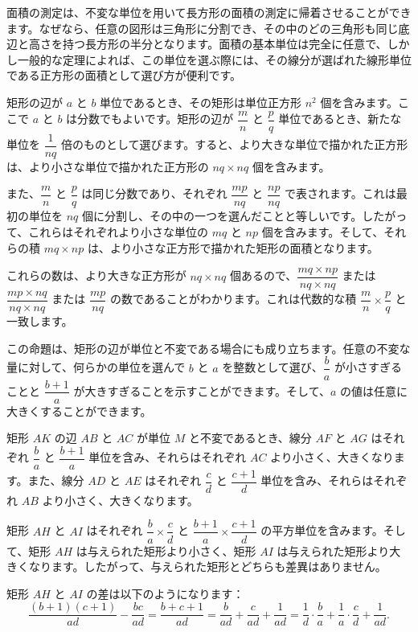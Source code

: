 \documentclass[a4paper,11pt,openany]{ltjsbook}
\begin{document}
面積の測定は、不変な単位を用いて長方形の面積の測定に帰着させることができます。なぜなら、任意の図形は三角形に分割でき、その中のどの三角形も同じ底辺と高さを持つ長方形の半分となります。面積の基本単位は完全に任意で、しかし一般的な定理によれば、この単位を選ぶ際には、その線分が選ばれた線形単位である正方形の面積として選び方が便利です。

矩形の辺が $a$ と $b$ 単位であるとき、その矩形は単位正方形 $n^2$ 個を含みます。ここで $a$ と $b$ は分数でもよいです。矩形の辺が $\dfrac{m}{n}$ と $\dfrac{p}{q}$ 単位であるとき、新たな単位を $\dfrac{1}{nq}$ 倍のものとして選びます。すると、より大きな単位で描かれた正方形は、より小さな単位で描かれた正方形の $nq \times nq$ 個を含みます。

また、$\dfrac{m}{n}$ と $\dfrac{p}{q}$ は同じ分数であり、それぞれ $\dfrac{mp}{nq}$ と $\dfrac{np}{nq}$ で表されます。これは最初の単位を $nq$ 個に分割し、その中の一つを選んだことと等しいです。したがって、これらはそれぞれより小さな単位の $mq$ と $np$ 個を含みます。そして、それらの積 $mq \times np$ は、より小さな正方形で描かれた矩形の面積となります。

これらの数は、より大きな正方形が $nq \times nq$ 個あるので、$\dfrac{mq \times np}{nq \times nq}$ または $\dfrac{mp \times nq}{nq \times nq}$ または $\dfrac{mp}{nq}$ の数であることがわかります。これは代数的な積 $\dfrac{m}{n} \times \dfrac{p}{q}$ と一致します。

この命題は、矩形の辺が単位と不変である場合にも成り立ちます。任意の不変な量に対して、何らかの単位を選んで $b$ と $a$ を整数として選び、$\dfrac{b}{a}$ が小さすぎることと $\dfrac{b+1}{a}$ が大きすぎることを示すことができます。そして、$a$ の値は任意に大きくすることができます。

矩形 $AK$ の辺 $AB$ と $AC$ が単位 $M$ と不変であるとき、線分 $AF$ と $AG$ はそれぞれ $\dfrac{b}{a}$ と $\dfrac{b+1}{a}$ 単位を含み、それらはそれぞれ $AC$ より小さく、大きくなります。また、線分 $AD$ と $AE$ はそれぞれ $\dfrac{c}{d}$ と $\dfrac{c+1}{d}$ 単位を含み、それらはそれぞれ $AB$ より小さく、大きくなります。

矩形 $AH$ と $AI$ はそれぞれ $\dfrac{b}{a} \times \dfrac{c}{d}$ と $\dfrac{b+1}{a} \times \dfrac{c+1}{d}$ の平方単位を含みます。そして、矩形 $AH$ は与えられた矩形より小さく、矩形 $AI$ は与えられた矩形より大きくなります。したがって、与えられた矩形とどちらも差異はありません。

矩形 $AH$ と $AI$ の差は以下のようになります：
\[
\dfrac{(b+1)(c+1)}{ad} - \dfrac{bc}{ad} = \dfrac{b+c+1}{ad}
= \dfrac{b}{ad} + \dfrac{c}{ad} + \dfrac{1}{ad}
= \dfrac{1}{d} \cdot \dfrac{b}{a} + \dfrac{1}{a} \cdot \dfrac{c}{d} + \dfrac{1}{ad}.
\]
\end{document}
